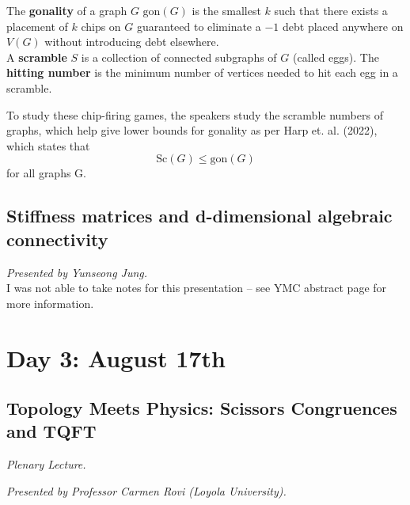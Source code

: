 \documentclass[12pt]{amsart}
\begin{document}
\begin{definition}
The \textbf{gonality} of a graph $G$ $\mathrm{gon}(G)$ is the smallest $k$ such that there exists a placement of $k$ chips on $G$ guaranteed to eliminate a $-1$ debt placed anywhere on $V(G)$ without introducing debt elsewhere. \\

A \textbf{scramble} $S$ is a collection of connected subgraphs of $G$ (called eggs). The \textbf{hitting number} is the minimum number of vertices needed to hit each egg in a scramble.
\end{definition}


\begin{result*}
To study these chip-firing games, the speakers study the scramble numbers of graphs, which help give lower bounds for gonality as per Harp et. al. (2022), which states that \[ \mathrm{Sc}(G) \leq \mathrm{gon}(G)\] for all graphs G.
\end{result*}

\vspace{2cm}

\subsection{Stiffness matrices and d-dimensional algebraic connectivity}

\textit{}

\vspace{0.25cm}
\textit{Presented by Yunseong Jung.} \\

I was not able to take notes for this presentation -- see YMC abstract page for more information.

\newpage

\section{Day 3: August 17th}

\subsection{Topology Meets Physics: Scissors Congruences and TQFT}

\textit{Plenary Lecture.}
\vspace{0.25cm}

\textit{Presented by Professor Carmen Rovi (Loyola University).} \\
\end{document}
